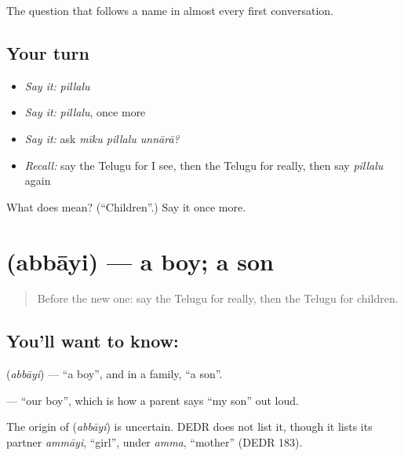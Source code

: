 \begin{grammarlens}[title={What you've built}]
The question that follows a name in almost every first conversation.
\end{grammarlens}

\subsection*{Your turn}
\begin{itemize}
\raggedright
  \item \emph{Say it:} \emph{pillalu}
  \item \emph{Say it:} \emph{pillalu}, once more
  \item \emph{Say it:} ask \emph{mīku pillalu unnārā?}
  \item \emph{Recall:} say the Telugu for I see, then the Telugu for really, then say \emph{pillalu} again
\end{itemize}

\begin{tcolorbox}[breakable,colback=teal!4,colframe=teal!35!black,title={Before you move on}]
What does  mean? (\textquotedblleft{}Children\textquotedblright{}.) Say it once more.
\end{tcolorbox}
\section[\texorpdfstring{\te{అబ్బాయి} (abbāyi)}{అబ్బాయి (abbāyi)}]{ (abbāyi) — a boy; a son}

\label{lesson:TE-C88-boy}



\begin{quote}
Before the new one: say the Telugu for really, then the Telugu for children.
\end{quote}

\subsection*{You'll want to know: }
\textbf{} (\emph{abbāyi}) — \textquotedblleft{}a boy\textquotedblright{}, and in a family, \textquotedblleft{}a son\textquotedblright{}.

\textbf{ } — \textquotedblleft{}our boy\textquotedblright{}, which is how a parent says \textquotedblleft{}my son\textquotedblright{} out loud.

\begin{cousinweb}
The origin of \textbf{} (\emph{abbāyi}) is uncertain. DEDR does not list it, though it lists its partner \emph{ammāyi}, \textquotedblleft{}girl\textquotedblright{}, under \emph{amma}, \textquotedblleft{}mother\textquotedblright{} (DEDR 183).
\end{cousinweb}

